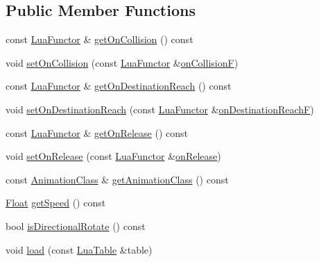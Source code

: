 \subsection*{Public Member Functions}
\begin{DoxyCompactItemize}
\item 
const \hyperlink{classZeta_1_1LuaFunctor}{Lua\+Functor} \& \hyperlink{classZeta_1_1ProjectileClass_a2ddf1d00628893348e6d91180232bc91}{get\+On\+Collision} () const 
\item 
void \hyperlink{classZeta_1_1ProjectileClass_a43c864ffb777d1636fbeb5324dd61fcc}{set\+On\+Collision} (const \hyperlink{classZeta_1_1LuaFunctor}{Lua\+Functor} \&\hyperlink{classZeta_1_1ProjectileClass_a08f1625c591d5cb199dd7cfd110bfe6c}{on\+Collision\+F})
\item 
const \hyperlink{classZeta_1_1LuaFunctor}{Lua\+Functor} \& \hyperlink{classZeta_1_1ProjectileClass_ad04c9fe40fe805df5098e4e1561df636}{get\+On\+Destination\+Reach} () const 
\item 
void \hyperlink{classZeta_1_1ProjectileClass_ad01e66330094ea4d0d47137a028e7764}{set\+On\+Destination\+Reach} (const \hyperlink{classZeta_1_1LuaFunctor}{Lua\+Functor} \&\hyperlink{classZeta_1_1ProjectileClass_ab237dd1036988cc3a6c4cdb00bf9317e}{on\+Destination\+Reach\+F})
\item 
const \hyperlink{classZeta_1_1LuaFunctor}{Lua\+Functor} \& \hyperlink{classZeta_1_1ProjectileClass_a08a22d5481dc19308f94bbbf7d8067e4}{get\+On\+Release} () const 
\item 
void \hyperlink{classZeta_1_1ProjectileClass_a9570f46faa11d6b683d24e22541a6882}{set\+On\+Release} (const \hyperlink{classZeta_1_1LuaFunctor}{Lua\+Functor} \&\hyperlink{classZeta_1_1ProjectileClass_a95bcce095c57f5186dfc8f7e774810f5}{on\+Release})
\item 
const \hyperlink{classZeta_1_1AnimationClass}{Animation\+Class} \& \hyperlink{classZeta_1_1ProjectileClass_a3a1ed1f4a4bc58bcc15c1c937a2aa3a9}{get\+Animation\+Class} () const 
\item 
\hyperlink{namespaceZeta_a1e0a1265f9b3bd3075fb0fabd39088ba}{Float} \hyperlink{classZeta_1_1ProjectileClass_a2b4c9be99b5a93482a3737bd723832c0}{get\+Speed} () const 
\item 
bool \hyperlink{classZeta_1_1ProjectileClass_a3345a4d39a77044417fd944a38f11e9d}{is\+Directional\+Rotate} () const 
\item 
void \hyperlink{classZeta_1_1ProjectileClass_a3626482a3dcbae4811a20045640e5869}{load} (const \hyperlink{classZeta_1_1LuaTable}{Lua\+Table} \&table)

\end{DoxyCompactItemize}
